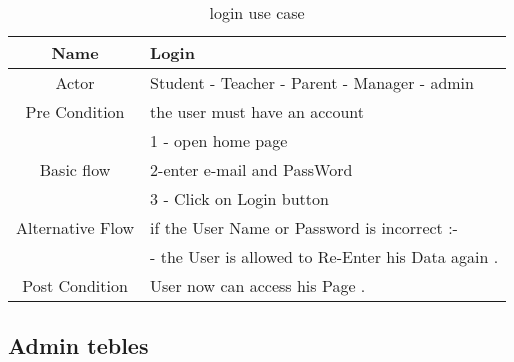 \documentclass{article}
\begin{document}
	\begin{table}[!h]
		
		\caption{login use case }
		\centering
		\label{loginfunction}
		
		\begin{tabular}{|c|l|}
			\hline
			Name                 & Login \\
			\hline
			Actor                & Student - Teacher - Parent - Manager - admin  \\
			\hline
			Pre Condition        & the user must have an account \\
			\hline
			&  1 - open home page \\
			Basic flow           & 2-enter e-mail and PassWord \\
			& 3 - Click on Login button\\
			\hline
			
			Alternative Flow    & if the User Name or Password is incorrect :-\\
			& - the User is allowed to Re-Enter his Data again . \\
			\hline
			
			Post Condition      & User now can access his Page . \\
			
			\hline
			
		\end{tabular}
		
	\end{table}
	
	\subsection{Admin tebles}
	
\end{document}
